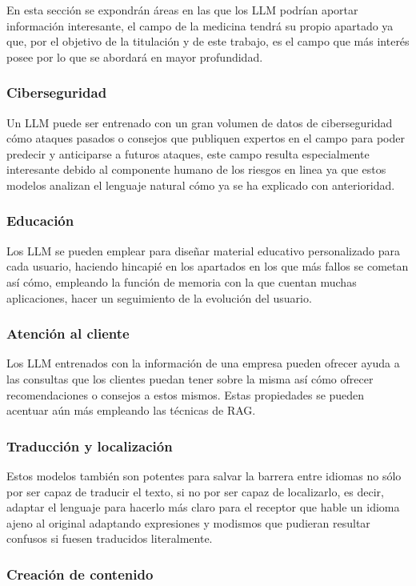 En esta sección se expondrán áreas en las que los LLM podrían aportar información interesante, el campo de la medicina tendrá su propio apartado ya que, por el objetivo de la titulación y de este trabajo, es el campo que más interés posee por lo que se abordará en mayor profundidad.
\subsubsection{Ciberseguridad}

Un LLM puede ser entrenado con un gran volumen de datos de ciberseguridad cómo ataques pasados o consejos que publiquen expertos en el campo para poder predecir y anticiparse a futuros ataques, este campo resulta especialmente interesante debido al componente humano de los riesgos en linea ya que estos modelos analizan el lenguaje natural cómo ya se ha explicado con anterioridad. 
\subsubsection{Educación}

Los LLM se pueden emplear para diseñar material educativo personalizado para cada usuario, haciendo hincapié en los apartados en los que más fallos se cometan así cómo, empleando la función de memoria con la que cuentan muchas aplicaciones, hacer un seguimiento de la evolución del usuario.
\subsubsection{Atención al cliente}

Los LLM entrenados con la información de una empresa pueden ofrecer ayuda a las consultas que los clientes puedan tener sobre la misma así cómo ofrecer recomendaciones o consejos a estos mismos. Estas propiedades se pueden acentuar aún más empleando las técnicas de RAG.
\subsubsection{Traducción y localización}

Estos modelos también son potentes para salvar la barrera entre idiomas no sólo por ser capaz de traducir el texto, si no por ser capaz de localizarlo, es decir, adaptar el lenguaje para hacerlo más claro para el receptor que hable un idioma ajeno al original adaptando expresiones y modismos que pudieran resultar confusos si fuesen traducidos literalmente.
\subsubsection{Creación de contenido}


